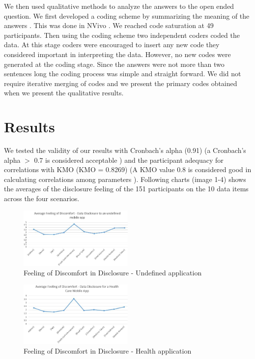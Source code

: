 \documentclass[conference]{IEEEtran}
\begin{document}
We then used qualitative methods to analyze the answers to the open ended question. We first developed a coding scheme by summarizing the meaning of the answers  \cite {wong2017eliciting}. This was done in NVivo \cite {saldana2015coding}. We reached code saturation at 49 participants. Then using the coding scheme two independent coders coded the data. At this stage coders were encouraged to insert any new code they considered important in interpreting the data. However, no new codes were generated at the coding stage. Since the answers were not more than two sentences long the coding process was simple and straight forward. We did not require iterative merging of codes and we present the primary codes obtained when we present the qualitative results.

\section {Results}

We tested the validity of our results with Cronbach's alpha (0.91) (a Cronbach's alpha $>$ 0.7 is considered acceptable \cite {nunnally1967psychometric}) and the participant adequacy for correlations with KMO (KMO =  0.8269) (A KMO value $0.8$ is considered good in calculating correlations among parameters \cite {kim1978factor}). Following charts (image 1-4) shows the averages of the disclosure feeling of the 151 participants on the 10 data items across the four scenarios.

\begin{figure}[h]
\begin{center}
\includegraphics[width=0.5\textwidth]{Average_Generic}
\caption{Feeling of Discomfort in Disclosure - Undefined application}
\end{center}
\end{figure}

\begin{figure}[h]
\begin{center}
\includegraphics[width=0.5\textwidth]{Average_Health}
\caption{Feeling of Discomfort in Disclosure - Health  application}
\end{center}
\end{figure}
\end{document}
